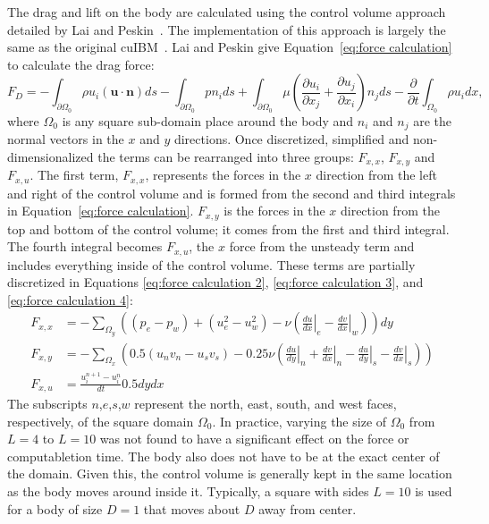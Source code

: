 The drag and lift on the body are calculated using the control volume approach detailed by Lai and Peskin~\cite{lai2000immersed}.
The implementation of this approach is largely the same as the original cuIBM~\cite{layton2011cuibm}. 
Lai and Peskin give Equation~\eqref{eq:force calculation} to calculate the drag force:
\begin{equation}\label{eq:force calculation}
F_D=-\int_{\partial \Omega_0} \rho u_i(\textbf{u}\cdot \textbf{n})ds- \int_{\partial \Omega_0}pn_ids+\int_{\partial \Omega_0}\mu \left(\frac{\partial u_i}{\partial x_j}+\frac{\partial u_j}{\partial x_i}\right)n_jds-\frac{\partial}{\partial t}\int_{\Omega_0}\rho u_i dx,
\end{equation}
where $\Omega_0$ is any square sub-domain place around the body and $n_i$ and $n_j$ are the normal vectors in the $x$ and $y$ directions. 
Once discretized, simplified and non-dimensionalized the terms can be rearranged into three groups: $F_{x,x}$, $F_{x,y}$ and $F_{x,u}$. 
The first term, $F_{x,x}$, represents the forces in the $x$ direction from the left and right of the control volume and is formed from the second and third integrals in Equation~\eqref{eq:force calculation}. 
$F_{x,y}$ is the forces in the $x$ direction from the top and bottom of the control volume; it comes from the first and third integral. 
The fourth integral becomes $F_{x,u}$, the $x$ force from the unsteady term and includes everything inside of the control volume. 
These terms are partially discretized in Equations \eqref{eq:force calculation 2}, \eqref{eq:force calculation 3}, and \eqref{eq:force calculation 4}:
\begin{align}
F_{x,x} &=-\sum_{\Omega_y}\left((p_e-p_w)+(u_e^2-u_w^2)-\nu\left(\left.\frac{du}{dx}\right|_e-\left.\frac{dv}{dx}\right|_w\right)\right)dy\label{eq:force calculation 2}\\
F_{x,y} &=-\sum_{\Omega_x}\left(0.5(u_nv_n-u_sv_s)-0.25\nu \left(\left.\frac{du}{dy}\right|_n+\left.\frac{dv}{dx}\right|_n-\left.\frac{du}{dy}\right|_s-\left.\frac{dv}{dx}\right|_s\right)\right)\label{eq:force calculation 3}\\
F_{x,u} &=\frac{u_i^{n+1}-u_i^{n}}{dt}0.5dydx\;\label{eq:force calculation 4}
\end{align}
The subscripts $n$,$e$,$s$,$w$ represent the north, east, south, and west faces, respectively, of the square domain $\Omega_0$.
In practice, varying the size of $\Omega_0$ from $L=4$ to $L=10$ was not found to have a significant effect on the force or computabletion time.
The body also does not have to be at the exact center of the domain.
Given this, the control volume is generally kept in the same location as the body moves around inside it.
Typically, a square with sides $L=10$ is used for a body of size $D=1$ that moves about $D$ away from center.

